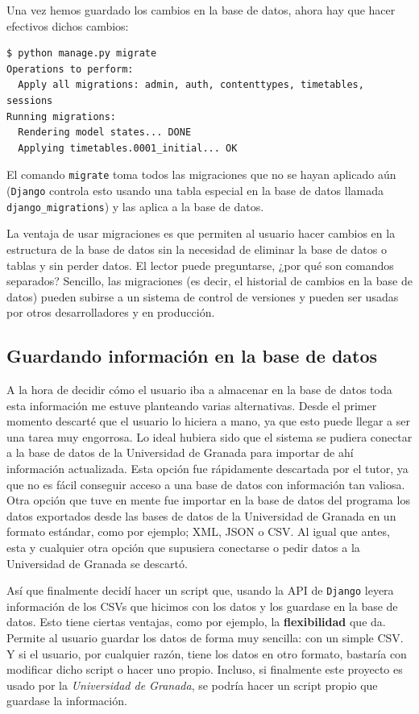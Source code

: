 Una vez hemos guardado los cambios en la base de datos, ahora hay que hacer efectivos dichos cambios:

\begin{verbatim}
$ python manage.py migrate
Operations to perform:
  Apply all migrations: admin, auth, contenttypes, timetables, sessions
Running migrations:
  Rendering model states... DONE
  Applying timetables.0001_initial... OK
\end{verbatim}

El comando \texttt{migrate} toma todos las migraciones que no se hayan aplicado aún (\texttt{Django} controla esto usando una tabla especial en la base de datos llamada \texttt{django\_migrations}) y las aplica a la base de datos.

La ventaja de usar migraciones es que permiten al usuario hacer cambios en la estructura de la base de datos sin la necesidad de eliminar la base de datos o tablas y sin perder datos. El lector puede preguntarse, ¿por qué son comandos separados? Sencillo, las migraciones (es decir, el historial de cambios en la base de datos) pueden subirse a un sistema de control de versiones y pueden ser usadas por otros desarrolladores y en producción.

\subsection{Guardando información en la base de datos}
A la hora de decidir cómo el usuario iba a almacenar en la base de datos toda esta información me estuve planteando varias alternativas. Desde el primer momento descarté que el usuario lo hiciera a mano, ya que esto puede llegar a ser una tarea muy engorrosa. Lo ideal hubiera sido que el sistema se pudiera conectar a la base de datos de la Universidad de Granada para importar de ahí información actualizada. Esta opción fue rápidamente descartada por el tutor, ya que no es fácil conseguir acceso a una base de datos con información tan valiosa. Otra opción que tuve en mente fue importar en la base de datos del programa los datos exportados desde las bases de datos de la Universidad de Granada en un formato estándar, como por ejemplo; XML, JSON o CSV. Al igual que antes, esta y cualquier otra opción que supusiera conectarse o pedir datos a la Universidad de Granada se descartó.

Así que finalmente decidí hacer un script que, usando la API de \texttt{Django} leyera información de los CSVs que hicimos con los datos y los guardase en la base de datos. Esto tiene ciertas ventajas, como por ejemplo, la \textbf{flexibilidad} que da. Permite al usuario guardar los datos de forma muy sencilla: con un simple CSV. Y si el usuario, por cualquier razón, tiene los datos en otro formato, bastaría con modificar dicho script o hacer uno propio. Incluso, si finalmente este proyecto es usado por la \textit{Universidad de Granada}, se podría hacer un script propio que guardase la información. 

